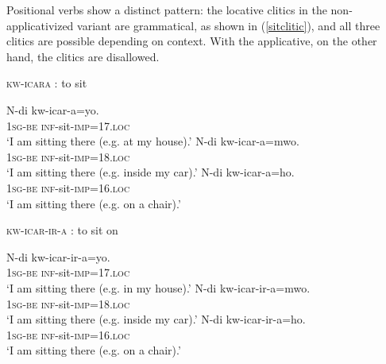 \documentclass[output=paper]{langsci/langscibook}
\begin{document}
\iffalse
Positional verbs show a distinct pattern: the locative clitics in the non-applicativized variant are grammatical, as shown in (\ref{sitclitic}), and all three clitics are possible depending on context. With the applicative, on the other hand, the clitics are disallowed.

\begin{exe}
      \ex\label{sitclitic} {\scshape kw-icara} : to sit \begin{xlist}
	      \ex\gll N-di kw-icar-a=yo.\\
			      1{\scshape sg-be} {\scshape inf-}sit{-\scshape imp=17.loc}\\
		      \glt `I am sitting there (e.g. at my house).'
	      \ex\gll N-di kw-icar-a=mwo. \\
1{\scshape sg-be} {\scshape inf-}sit{-\scshape imp=18.loc}\\
		      \glt `I am sitting there (e.g. inside my car).'
	      \ex\gll N-di kw-icar-a=ho.\\
			      {\scshape 1sg-be} {\scshape inf-}sit{-\scshape imp=16.loc}\\
      \glt `I am sitting there (e.g. on a chair).'
      \end{xlist}
      \ex\label{sitonclitic} {\scshape kw-icar-ir-a} : to sit on\begin{xlist}
	      \ex\gll *N-di kw-icar-ir-a=yo.\\
			      1{\scshape sg-be} {\scshape inf-}sit{-\scshape imp=17.loc}\\
		      \glt `I am sitting there (e.g. in my house).'
	      \ex\gll *N-di kw-icar-ir-a=mwo. \\
1{\scshape sg-be} {\scshape inf-}sit{-\scshape imp=18.loc}\\
		      \glt `I am sitting there (e.g. inside my car).'
	      \ex\gll *N-di kw-icar-ir-a=ho.\\
			      1{\scshape sg-be} {\scshape inf-}sit{-\scshape imp=16.loc}\\
		      \glt `I am sitting there (e.g. on a chair).'

\end{xlist}

\end{exe}
%
\end{document}
